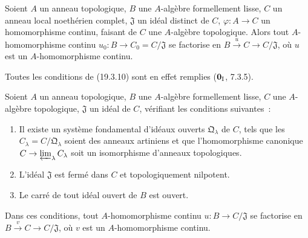 \begin{corollary}[19.3.11]
\label{0.19.3.11-fr}
Soient $A$ un anneau topologique, $B$ une $A$-algèbre formellement lisse,
$C$ un anneau local noethérien complet, $\mathfrak J$ un idéal distinct de
$C$, $\varphi:A\to C$ un homomorphisme continu, faisant de $C$ une
$A$-algèbre topologique. Alors tout $A$-homomorphisme continu
$u_0:B\to C_0=C/\mathfrak J$ se factorise en
$B\xrightarrow{u}C\to C/\mathfrak J$, où $u$ est un $A$-homomorphisme
continu.
\end{corollary}

Toutes les conditions de (19.3.10) sont en effet remplies
($\mathbf 0_{\rm I}$, 7.3.5).

\begin{proposition}[19.3.12]
\label{0.19.3.12-fr}
Soient $A$ un anneau topologique, $B$ une $A$-algèbre formellement lisse,
$C$ une $A$-algèbre topologique, $\mathfrak J$ un idéal de $C$, vérifiant les
conditions suivantes~:
\begin{enumerate}
  \item[$1^\circ$] Il existe un système fondamental d'idéaux ouverts
  $\mathfrak Q_\lambda$ de $C$, tels que les
  $C_\lambda=C/\mathfrak Q_\lambda$ soient des anneaux artiniens et que
  l'homomorphisme canonique $C\to\varprojlim_\lambda C_\lambda$ soit un
  isomorphisme d'anneaux topologiques.
  \item[$2^\circ$] L'idéal $\mathfrak J$ est fermé dans $C$ et
  topologiquement nilpotent.
  \item[$3^\circ$] Le carré de tout idéal ouvert de $B$ est ouvert.
\end{enumerate}
Dans ces conditions, tout $A$-homomorphisme continu
$u:B\to C/\mathfrak J$ se factorise en
$B\xrightarrow{v}C\to C/\mathfrak J$, où $v$ est un $A$-homomorphisme
continu.
\end{proposition}


